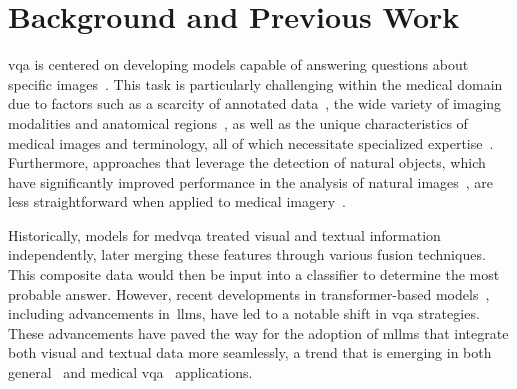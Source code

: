 \section{Background and Previous Work}
\label{sec:locvqallm_background}

\gls{vqa} is centered on developing models capable of answering questions about specific images~\cite{antol2015vqa}. This task is particularly challenging within the medical domain due to factors such as a scarcity of annotated data~\cite{Nguyen19,liu2019effective}, the wide variety of imaging modalities and anatomical regions~\cite{gupta2021hierarchical}, as well as the unique characteristics of medical images and terminology, all of which necessitate specialized expertise~\cite{liu2019effective,zhan2020medical}. Furthermore, approaches that leverage the detection of natural objects, which have significantly improved performance in the analysis of natural images~\cite{anderson2018bottom}, are less straightforward when applied to medical imagery~\cite{gupta2021hierarchical}.

Historically, models for \gls{medvqa} treated visual and textual information independently, later merging these features through various fusion techniques. This composite data would then be input into a classifier to determine the most probable answer. However, recent developments in transformer-based models~\cite{vaswani2017attention}, including advancements in~\glspl{llm}, have led to a notable shift in \gls{vqa} strategies. These advancements have paved the way for the adoption of \glspl{mllm} that integrate both visual and textual data more seamlessly, a trend that is emerging in both general~\cite{yin2023survey,tong2024eyes,zhang2024mm} and medical \gls{vqa}~\cite{seenivasan2023surgicalgpt,zhang2023pmc} applications.

